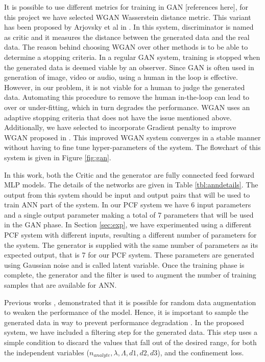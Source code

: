 \documentclass[draft, 10pt]{IEEEtran}
\begin{document}
It is possible to use different metrics for training in GAN [references here], for this project we have selected WGAN Wasserstein distance metric. This variant has been proposed by Arjovsky et al in \cite{arjovsky2017wasserstein}. In this system, discriminator is named as critic and it measures the distance between the generated data and the real data. The reason behind choosing WGAN over other methods is to be able to determine a stopping criteria. In a regular GAN system, training is stopped when the generated data is deemed viable by an observer. Since GAN is often used in generation of image, video or audio, using a human in the loop is effective. However, in our problem, it is not viable for a human to judge the generated data. Automating this procedure to remove the human in-the-loop can lead to over or under-fitting, which in turn degrades the performance. WGAN uses an adaptive stopping criteria that does not have the issue mentioned above. Additionally, we have selected to incorporate Gradient penalty to improve WGAN proposed in \cite{gulrajani2017improved}. This improved WGAN system converges in a stable manner without having to fine tune hyper-parameters of the system. The flowchart of this system is given in Figure \ref{fig:gan}.

In this work, both the Critic and the generator are fully connected feed forward MLP models. The details of the networks are given in Table \ref{tbl:anndetails}. The output from this system should be input and output pairs that will be used to train ANN part of the system. In our PCF system we have 6 input parameters and a single output parameter making a total of 7 parameters that will be used in the GAN phase. In Section \ref{sec:exp}, we have experimented using a different PCF system with different inputs, resulting a different number of parameters for the system. The generator is supplied with the same number of parameters as its expected output, that is 7 for our PCF system. These parameters are generated using Gaussian noise and is called latent variable. Once the training phase is complete, the generator and the filter is used to augment the number of training samples that are available for ANN.

Previous works \cite{ravuri2019seeing, shmelkov2018good}, demonstrated that it is possible for random data augmentation to weaken the performance of the model. Hence, it is important to sample the generated data in way to prevent performance degradation \cite{bhattarai2019sampling}. In the proposed system, we have included a filtering step for the generated data. This step uses a simple condition to discard the values that fall out of the desired range, for both the independent variables ($n_{analyte}, \lambda, \Lambda, d1, d2, d3$), and the confinement loss.
\end{document}
